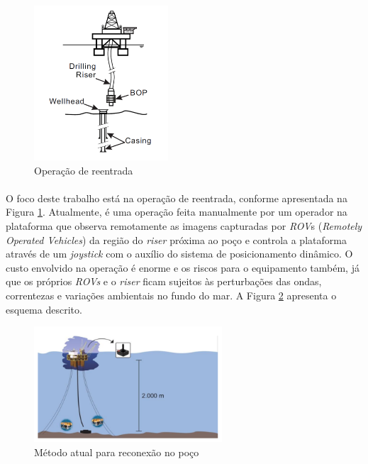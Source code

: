 \begin{figure}[ht!]
\centering
  \includegraphics[width=5cm]{figs/introducao/riser}
  \caption{Operação de reentrada \cite{eugenioASME2012}\label{riser}}
\end{figure}



\paragraph{} O foco deste trabalho está na operação de reentrada, conforme apresentada na Figura \ref{riser}. Atualmente, é uma operação feita manualmente por um operador na plataforma que observa remotamente as imagens capturadas por \textit{ROV}s (\textit{Remotely Operated Vehicles}) da região do \textit{riser} próxima ao poço e controla a plataforma através de um \textit{joystick} com o auxílio do sistema de posicionamento dinâmico. O custo envolvido na operação é enorme e os riscos para o equipamento também, já que os próprios \textit{ROVs} e o \textit{riser} ficam sujeitos às perturbações das ondas, correntezas e variações ambientais no fundo do mar. A Figura \ref{posicionamentoAtual} apresenta o esquema descrito.

\begin{figure}[ht!]
\centering
  \includegraphics[width=7cm]{figs/introducao/posicionamentoAtual}
  \caption{Método atual para reconexão no poço \cite{redytton} \label{posicionamentoAtual}}
\end{figure}

